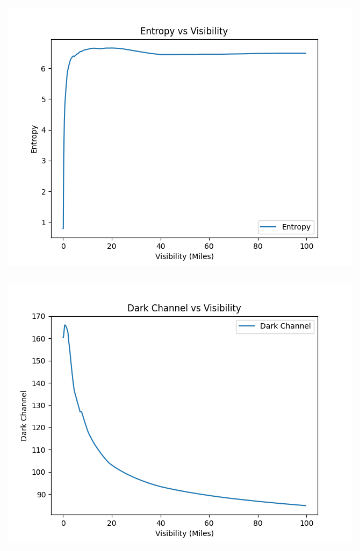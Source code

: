 \begin{figure}
\begin{subfigure}[b]{0.4\textwidth}
    \end{subfigure}
    \begin{subfigure}[b]{0.4\textwidth}
        \includegraphics[width=\textwidth]{imgs/entropy_vs_visibility.png}
    \end{subfigure}
    \begin{subfigure}[b]{0.4\textwidth}
    \includegraphics[width=\textwidth]{imgs/dark_channel_vs_visibility.png}
        

\end{subfigure}
\end{figure}
